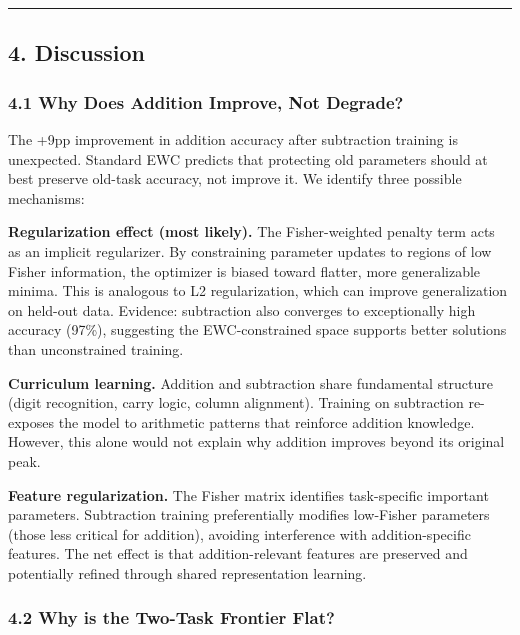 \documentclass[
]{article}
\begin{document}
\begin{center}\rule{0.5\linewidth}{0.5pt}\end{center}

\subsection{4. Discussion}\label{discussion}

\subsubsection{4.1 Why Does Addition Improve, Not
Degrade?}\label{why-does-addition-improve-not-degrade}

The +9pp improvement in addition accuracy after subtraction training is
unexpected. Standard EWC predicts that protecting old parameters should
at best preserve old-task accuracy, not improve it. We identify three
possible mechanisms:

\textbf{Regularization effect (most likely).} The Fisher-weighted
penalty term acts as an implicit regularizer. By constraining parameter
updates to regions of low Fisher information, the optimizer is biased
toward flatter, more generalizable minima. This is analogous to L2
regularization, which can improve generalization on held-out data.
Evidence: subtraction also converges to exceptionally high accuracy
(97\%), suggesting the EWC-constrained space supports better solutions
than unconstrained training.

\textbf{Curriculum learning.} Addition and subtraction share fundamental
structure (digit recognition, carry logic, column alignment). Training
on subtraction re-exposes the model to arithmetic patterns that
reinforce addition knowledge. However, this alone would not explain why
addition improves beyond its original peak.

\textbf{Feature regularization.} The Fisher matrix identifies
task-specific important parameters. Subtraction training preferentially
modifies low-Fisher parameters (those less critical for addition),
avoiding interference with addition-specific features. The net effect is
that addition-relevant features are preserved and potentially refined
through shared representation learning.

\subsubsection{4.2 Why is the Two-Task Frontier
Flat?}\label{why-is-the-two-task-frontier-flat}
\end{document}
